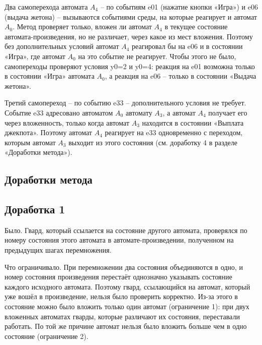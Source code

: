 \documentclass[12pt]{article}
\begin{document}
Два самоперехода автомата $A_{4}$ – по событиям e01 (нажатие кнопки «Игра») и e06 (выдача жетона) – вызываются событиями среды, на которые реагирует и автомат $A_{0}$. Метод проверяет только, вложен ли автомат $A_{4}$ в текущее состояние автомата-произведения, но не различает, через какое из мест вложения. Поэтому без дополнительных условий автомат $A_{4}$ реагировал бы на e06 и в состоянии «Игра», где автомат $A_{0}$ на это событие не реагирует. Чтобы этого не было, самопереходы проверяют условия y0=2 и y0=4: реакция на e01 возможна только в состоянии «Игра» автомата $A_{0}$, а реакция на e06 – только в состоянии «Выдача жетона».

Третий самопереход – по событию e33 – дополнительного условия не требует. Событие e33 адресовано автоматом $A_{0}$ автомату $A_{3}$, а автомат $A_{4}$ получает его через вложенность, только когда автомат $A_{3}$ находится в состоянии «Выплата джекпота». Поэтому автомат $A_{4}$ реагирует на e33 одновременно с переходом, которым автомат $A_{3}$ выходит из этого состояния (см. доработку 4 в разделе «Доработки метода»).

\subsection*{Доработки метода}

\subsection*{Доработка 1}

Было. Гвард, который ссылается на состояние другого автомата, проверялся по номеру состояния этого автомата в автомате-произведении, полученном на предыдущих шагах перемножения.

Что ограничивало. При перемножении два состояния объединяются в одно, и номер состояния произведения перестаёт однозначно указывать состояние каждого исходного автомата. Поэтому гвард, ссылающийся на автомат, который уже вошёл в произведение, нельзя было проверить корректно. Из-за этого в состояние можно было вложить только один автомат (ограничение 1): при двух вложенных автоматах гварды, которые различают их состояния, переставали работать. По той же причине автомат нельзя было вложить больше чем в одно состояние (ограничение 2).
\end{document}

